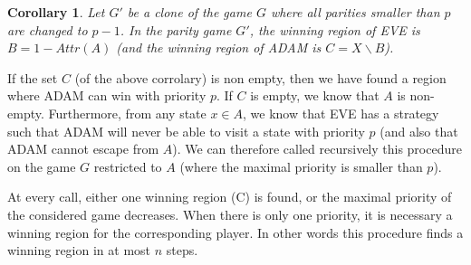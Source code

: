 \documentclass{article}
\newtheorem{corollary}{Corollary}
\begin{document}
\begin{corollary}
Let $G'$ be a clone of the game $G$ where all parities smaller than $p$ are changed to $p-1$. In the parity game $G'$, the winning region of EVE is $B = 1-Attr(A)$ (and the winning region of ADAM is $C=X \backslash B$).
\end{corollary}
If the set $C$ (of the above corrolary) is non empty, then we have found a region where ADAM can win with priority $p$.
If $C$ is empty, we know that $A$ is non-empty.
Furthermore, from any state $x \in A$, we know that EVE has a strategy such that ADAM will never be able to visit a state with priority $p$ (and also that ADAM cannot escape from $A$). We can therefore called recursively this procedure on the game $G$ restricted to $A$ (where the maximal priority is smaller than $p$). 

At every call, either one winning region (C) is found, or the maximal priority of the considered game decreases. When there is only one priority, it is necessary a winning region for the corresponding player. In other words this procedure finds a winning region in at most $n$ steps. 






 
\end{document}
